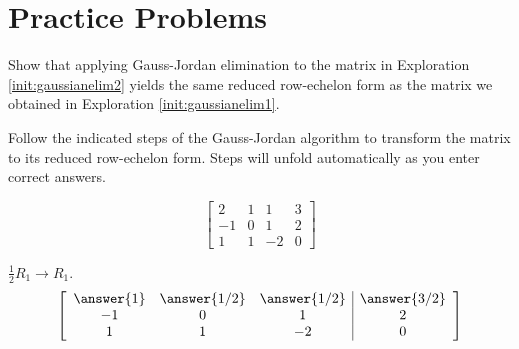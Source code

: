 \documentclass{ximera}
\begin{document}
 
 


\section*{Practice Problems}

\begin{problem}\label{prob:same_rref}
Show that applying Gauss-Jordan elimination to the matrix in Exploration \ref{init:gaussianelim2} yields the same reduced row-echelon form as the matrix we obtained in Exploration \ref{init:gaussianelim1}.
\end{problem}

\begin{problem}\label{prob:twowaystorref1}
Follow the indicated steps of the Gauss-Jordan algorithm to transform the matrix to its reduced row-echelon form.  Steps will unfold automatically as you enter correct answers.

$$\left[\begin{array}{ccc|c}  2&1&1&3\\-1&0&1&2\\1&1&-2&0
  \end{array}\right]$$

 \begin{prompt}  $\frac{1}{2}R_1\rightarrow R_1$.
$$ \left[\begin{array}{ccc|c}   \answer{1}&\answer{1/2}&\answer{1/2}&\answer{3/2}\\-1&0&1&2\\1&1&-2&0
  \end{array}\right]$$
 \end{prompt} 


\end{problem}
\end{document}
